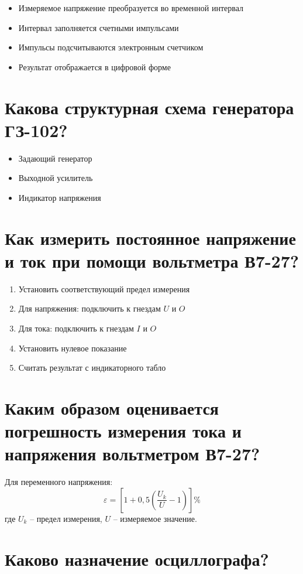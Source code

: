 \documentclass[14pt, a4paper, twoside]{extreport}
\begin{document}
\begin{itemize}
  \item Измеряемое напряжение преобразуется во временной интервал
  \item Интервал заполняется счетными импульсами
  \item Импульсы подсчитываются электронным счетчиком
  \item Результат отображается в цифровой форме
\end{itemize}

\section{Какова структурная схема генератора ГЗ-102?}

\begin{itemize}
  \item Задающий генератор
  \item Выходной усилитель
  \item Индикатор напряжения
\end{itemize}

\section{Как измерить постоянное напряжение и ток при помощи вольтметра В7-27?}

\begin{enumerate}
  \item Установить соответствующий предел измерения
  \item Для напряжения: подключить к гнездам $U$ и $O$
  \item Для тока: подключить к гнездам $I$ и $O$
  \item Установить нулевое показание
  \item Считать результат с индикаторного табло
\end{enumerate}

\section{Каким образом оценивается погрешность измерения тока и напряжения вольтметром В7-27?}

Для переменного напряжения:
\[
  \varepsilon = \left[1 + 0,5\left(\frac{U_k}{U} - 1\right)\right]\%
\]
где $U_k$ -- предел измерения, $U$ -- измеряемое значение.

\section{Каково назначение осциллографа?}
\end{document}
